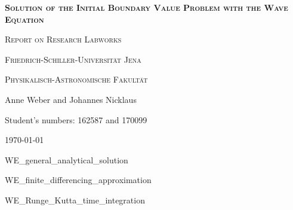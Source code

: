 \documentclass[a4paper,headsepline,12pt,oneside]{scrartcl}
\begin{document}
\begin{titlepage}
	\centering

	{\scshape\Large \textbf{Solution of the Initial Boundary Value Problem with the Wave Equation} \par}
	\vspace{1cm}
	{\scshape\Large Report on Research Labworks \par}
	\vspace{1.5cm}
	{\huge\bfseries \par}
	\vspace{2cm}
	{\scshape\large Friedrich-Schiller-Universität Jena\par}
	{\scshape\large Physikalisch-Astronomische Fakultät\par}
	\vfill
	{\Large Anne Weber and Johannes Nicklaus\par}
	\vfill
	{Student's numbers: 162587 and 170099\par}

	\vfill

	{\large \today\par}
\end{titlepage}


\newpage
\setcounter{page}{0}
\tableofcontents
\clearpage
\setcounter{page}{1}

{WE_general_analytical_solution}

\clearpage

{WE_finite_differencing_approximation}


\clearpage

\clearpage
{WE_Runge_Kutta_time_integration}

\clearpage
\end{document}
